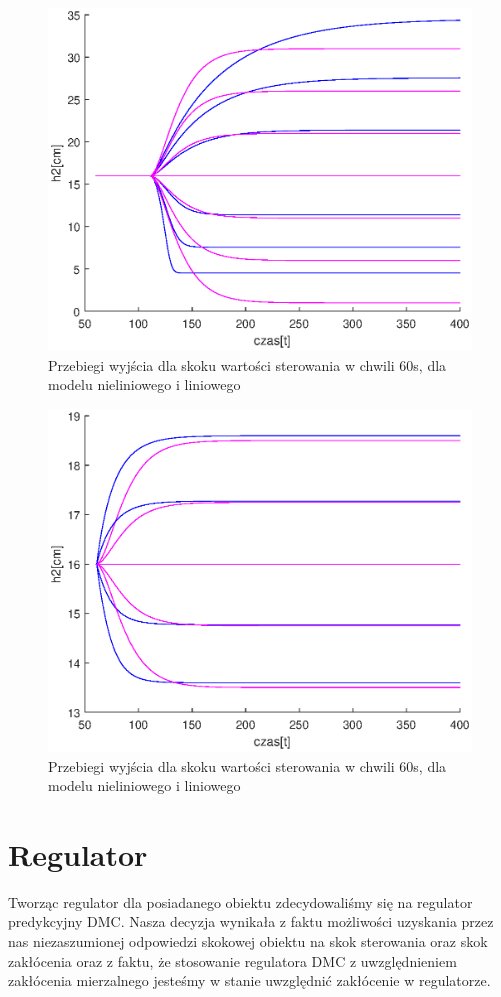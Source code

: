 		\begin{figure}
			\includegraphics[width=0.9\linewidth]{plots/z1_modellin_u.eps}
			\caption{Przebiegi wyjścia dla skoku wartości sterowania w chwili 60s, dla modelu nieliniowego i liniowego}
			\label{rys:modellin_u}
		\end{figure}
		\begin{figure}
			\includegraphics[width=0.9\linewidth]{plots/z1_modellin_z.eps}
			\caption{Przebiegi wyjścia dla skoku wartości sterowania w chwili 60s, dla modelu nieliniowego i liniowego}
			\label{rys:modellin_z}
		\end{figure}
		\newpage
	
	\section{Regulator}
		\label{sec:dmc}
		Tworząc regulator dla posiadanego obiektu zdecydowaliśmy się na regulator predykcyjny DMC. Nasza decyzja wynikała z faktu możliwości uzyskania przez nas niezaszumionej odpowiedzi skokowej obiektu na skok sterowania oraz skok zakłócenia oraz z faktu, że stosowanie regulatora DMC z uwzględnieniem zakłócenia mierzalnego jesteśmy w stanie uwzględnić zakłócenie w regulatorze.
		
